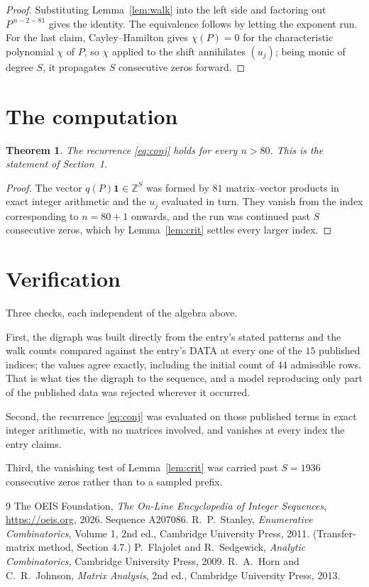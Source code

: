 \documentclass[11pt,a4paper]{article}
\theoremstyle{plain}
\newtheorem{theorem}{Theorem}
\theoremstyle{definition}
\begin{document}
\begin{proof}
Substituting Lemma~\ref{lem:walk} into the left side and factoring out
$P^{\,n-2-81}$ gives the identity. The equivalence follows by letting the exponent
run. For the last claim, Cayley--Hamilton gives $\chi(P)=0$ for the characteristic
polynomial $\chi$ of $P$, so $\chi$ applied to the shift annihilates $(u_j)$; being monic of
degree $S$, it propagates $S$ consecutive zeros forward.
\end{proof}

\section{The computation}

\begin{theorem}
The recurrence \eqref{eq:conj} holds for every $n>80$. This is the statement of
Section~1.
\end{theorem}

\begin{proof}
The vector $q(P)\mathbf{1}\in\mathbb{Z}^{S}$ was formed by $81$ matrix--vector
products in exact integer arithmetic and the $u_j$ evaluated in turn. They vanish from the
index corresponding to $n=80+1$ onwards, and the run was continued past $S$ consecutive
zeros, which by Lemma~\ref{lem:crit} settles every larger index.
\end{proof}

\section{Verification}

Three checks, each independent of the algebra above.

First, the digraph was built directly from the entry's stated patterns and the walk counts
compared against the entry's DATA at every one of the $15$ published indices; the
values agree exactly, including the initial count of $44$ admissible rows. That is
what ties the digraph to the sequence, and a model reproducing only part of the published
data was rejected wherever it occurred.

Second, the recurrence \eqref{eq:conj} was evaluated on those published terms in exact
integer arithmetic, with no matrices involved, and vanishes at every index the entry claims.

Third, the vanishing test of Lemma~\ref{lem:crit} was carried past $S=1936$ consecutive
zeros rather than to a sampled prefix.

\begin{thebibliography}{9}
 The OEIS Foundation, \emph{The On-Line Encyclopedia of Integer
Sequences}, \url{https://oeis.org}, 2026. Sequence A207086.
 R.~P.~Stanley, \emph{Enumerative Combinatorics}, Volume 1, 2nd ed.,
Cambridge University Press, 2011. (Transfer-matrix method, Section 4.7.)
 P.~Flajolet and R.~Sedgewick, \emph{Analytic Combinatorics}, Cambridge
University Press, 2009.
 R.~A.~Horn and C.~R.~Johnson, \emph{Matrix Analysis}, 2nd ed., Cambridge
University Press, 2013.
\end{thebibliography}
\end{document}
